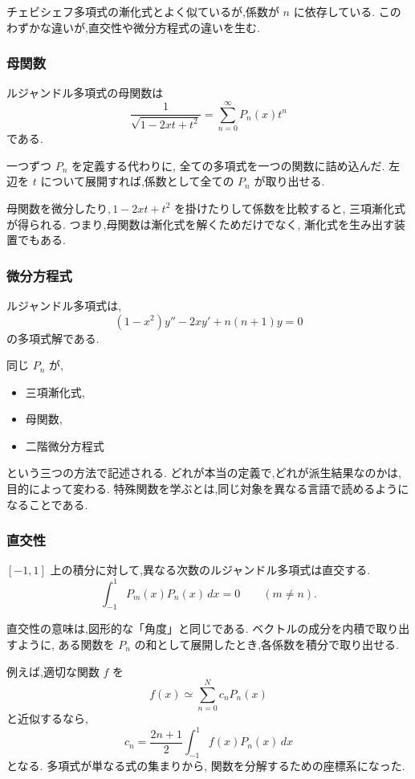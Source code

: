 チェビシェフ多項式の漸化式とよく似ているが,係数が $n$ に依存している.
このわずかな違いが,直交性や微分方程式の違いを生む.

\subsubsection{母関数}

ルジャンドル多項式の母関数は
\[
  \frac1{\sqrt{1-2xt+t^2}}
  =\sum_{n=0}^{\infty}P_n(x)t^n
\]
である.

一つずつ $P_n$ を定義する代わりに,
全ての多項式を一つの関数に詰め込んだ.
左辺を $t$ について展開すれば,係数として全ての $P_n$ が取り出せる.

母関数を微分したり,\,$1-2xt+t^2$ を掛けたりして係数を比較すると,
三項漸化式が得られる.
つまり,母関数は漸化式を解くためだけでなく,
漸化式を生み出す装置でもある.

\subsubsection{微分方程式}

ルジャンドル多項式は,
\[
  (1-x^2)y''-2xy'+n(n+1)y=0
\]
の多項式解である.

同じ $P_n$ が,
\begin{itemize}
  \item 三項漸化式,
  \item 母関数,
  \item 二階微分方程式
\end{itemize}
という三つの方法で記述される.
どれが本当の定義で,どれが派生結果なのかは,目的によって変わる.
特殊関数を学ぶとは,同じ対象を異なる言語で読めるようになることである.

\subsubsection{直交性}

$[-1,1]$ 上の積分に対して,異なる次数のルジャンドル多項式は直交する.
\[
  \int_{-1}^{1}P_m(x)P_n(x)\,dx=0
  \qquad(m\neq n).
\]

直交性の意味は,図形的な「角度」と同じである.
ベクトルの成分を内積で取り出すように,
ある関数を $P_n$ の和として展開したとき,各係数を積分で取り出せる.

例えば,適切な関数 $f$ を
\[
  f(x)\simeq\sum_{n=0}^{N}c_nP_n(x)
\]
と近似するなら,
\[
  c_n=
  \frac{2n+1}{2}
  \int_{-1}^{1}f(x)P_n(x)\,dx
\]
となる.
多項式が単なる式の集まりから,
関数を分解するための座標系になった.

